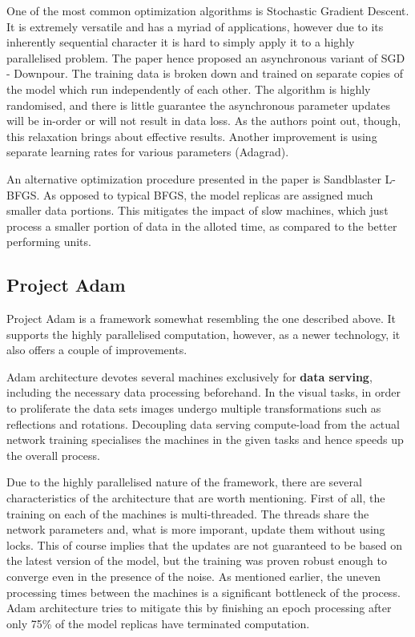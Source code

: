 \documentclass[a4paper, 12pt]{article}
\numberwithin{equation}{section}
\begin{document}
	One of the most common optimization algorithms is Stochastic Gradient Descent. It is extremely versatile and has a myriad of applications, however due to its inherently sequential character it is hard to simply apply it to a highly parallelised problem. The paper hence proposed an asynchronous variant of SGD - Downpour. The training data is broken down and trained on separate copies of the model which run independently of each other. The algorithm is highly randomised, and there is little guarantee the asynchronous parameter updates will be in-order or will not result in data loss. As the authors point out, though, this relaxation brings about effective results. Another improvement is using separate learning rates for various parameters (Adagrad).
	
	An alternative optimization procedure presented in the paper is Sandblaster L-BFGS. As opposed to typical BFGS, the model replicas are assigned much smaller data portions. This mitigates the impact of slow machines, which just process a smaller portion of data in the alloted time, as compared to the better performing units.		 
	
	\subsection{Project Adam}
	
	Project Adam is a framework somewhat resembling the one described above. It supports the highly parallelised computation, however, as a newer technology, it also offers a couple of improvements.
	
	Adam architecture devotes several machines exclusively for \textbf{data serving}, including the necessary data processing beforehand. In the visual tasks, in order to proliferate the data sets images undergo multiple transformations such as reflections and rotations. Decoupling data serving compute-load from the actual network training specialises the machines in the given tasks and hence speeds up the overall process.
	
	Due to the highly parallelised nature of the framework, there are several characteristics of the architecture that are worth mentioning. First of all, the training on each of the machines is multi-threaded. The threads share the network parameters and, what is more imporant, update them without using locks. This of course implies that the updates are not guaranteed to be based on the latest version of the model, but the training was proven robust enough to converge even in the presence of the noise. As mentioned earlier, the uneven processing times between the machines is a significant bottleneck of the process. Adam architecture tries to mitigate this by finishing an epoch processing after only 75\% of the model replicas have terminated computation.
	
\end{document}

